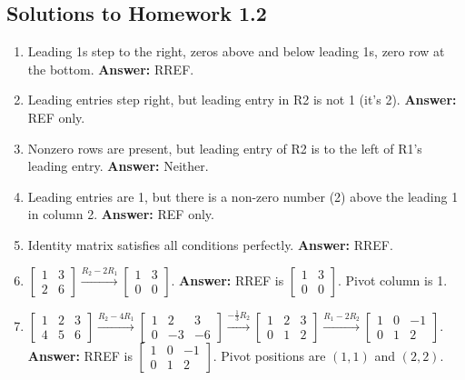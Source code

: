 \documentclass[11pt]{article}
\begin{document}
\subsection{Solutions to Homework 1.2}
\begin{enumerate}[label=\textbf{Sol 1.2.\arabic*}]
    \item Leading 1s step to the right, zeros above and below leading 1s, zero row at the bottom. \textbf{Answer:} RREF.
    \item Leading entries step right, but leading entry in R2 is not 1 (it's 2). \textbf{Answer:} REF only.
    \item Nonzero rows are present, but leading entry of R2 is to the left of R1's leading entry. \textbf{Answer:} Neither.
    \item Leading entries are 1, but there is a non-zero number (2) above the leading 1 in column 2. \textbf{Answer:} REF only.
    \item Identity matrix satisfies all conditions perfectly. \textbf{Answer:} RREF.
    \item $\left[\begin{array}{cc} 1 & 3 \\ 2 & 6 \end{array}\right] \xrightarrow{R_2-2R_1} \left[\begin{array}{cc} 1 & 3 \\ 0 & 0 \end{array}\right]$. \textbf{Answer:} RREF is $\left[\begin{array}{cc} 1 & 3 \\ 0 & 0 \end{array}\right]$. Pivot column is 1.
    \item $\left[\begin{array}{ccc} 1 & 2 & 3 \\ 4 & 5 & 6 \end{array}\right] \xrightarrow{R_2-4R_1} \left[\begin{array}{ccc} 1 & 2 & 3 \\ 0 & -3 & -6 \end{array}\right] \xrightarrow{-\frac{1}{3}R_2} \left[\begin{array}{ccc} 1 & 2 & 3 \\ 0 & 1 & 2 \end{array}\right] \xrightarrow{R_1-2R_2} \left[\begin{array}{ccc} 1 & 0 & -1 \\ 0 & 1 & 2 \end{array}\right]$. \textbf{Answer:} RREF is $\left[\begin{array}{ccc} 1 & 0 & -1 \\ 0 & 1 & 2 \end{array}\right]$. Pivot positions are $(1,1)$ and $(2,2)$.

\end{enumerate}
\end{document}
